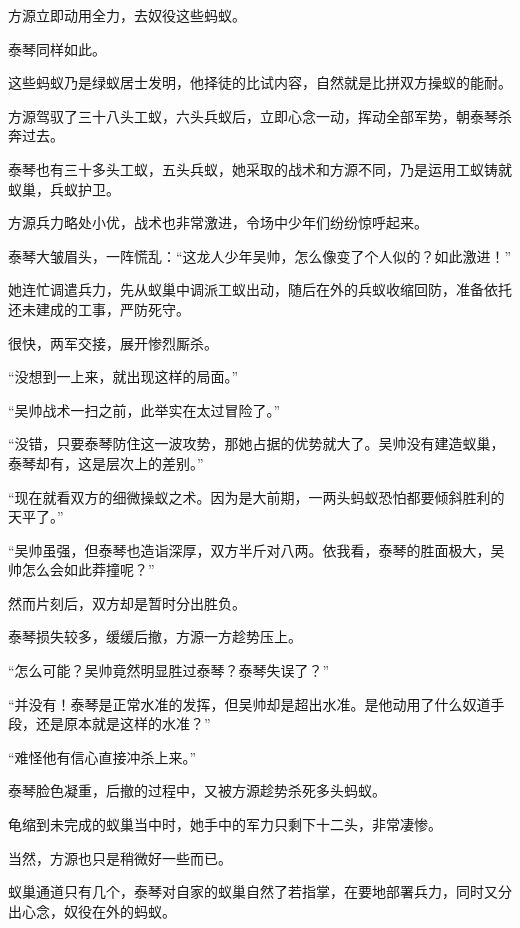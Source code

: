 
\begin{this_body}

方源立即动用全力，去奴役这些蚂蚁。

泰琴同样如此。

这些蚂蚁乃是绿蚁居士发明，他择徒的比试内容，自然就是比拼双方操蚁的能耐。

方源驾驭了三十八头工蚁，六头兵蚁后，立即心念一动，挥动全部军势，朝泰琴杀奔过去。

泰琴也有三十多头工蚁，五头兵蚁，她采取的战术和方源不同，乃是运用工蚁铸就蚁巢，兵蚁护卫。

方源兵力略处小优，战术也非常激进，令场中少年们纷纷惊呼起来。

泰琴大皱眉头，一阵慌乱：“这龙人少年吴帅，怎么像变了个人似的？如此激进！”

她连忙调遣兵力，先从蚁巢中调派工蚁出动，随后在外的兵蚁收缩回防，准备依托还未建成的工事，严防死守。

很快，两军交接，展开惨烈厮杀。

“没想到一上来，就出现这样的局面。”

“吴帅战术一扫之前，此举实在太过冒险了。”

“没错，只要泰琴防住这一波攻势，那她占据的优势就大了。吴帅没有建造蚁巢，泰琴却有，这是层次上的差别。”

“现在就看双方的细微操蚁之术。因为是大前期，一两头蚂蚁恐怕都要倾斜胜利的天平了。”

“吴帅虽强，但泰琴也造诣深厚，双方半斤对八两。依我看，泰琴的胜面极大，吴帅怎么会如此莽撞呢？”

然而片刻后，双方却是暂时分出胜负。

泰琴损失较多，缓缓后撤，方源一方趁势压上。

“怎么可能？吴帅竟然明显胜过泰琴？泰琴失误了？”

“并没有！泰琴是正常水准的发挥，但吴帅却是超出水准。是他动用了什么奴道手段，还是原本就是这样的水准？”

“难怪他有信心直接冲杀上来。”

泰琴脸色凝重，后撤的过程中，又被方源趁势杀死多头蚂蚁。

龟缩到未完成的蚁巢当中时，她手中的军力只剩下十二头，非常凄惨。

当然，方源也只是稍微好一些而已。

蚁巢通道只有几个，泰琴对自家的蚁巢自然了若指掌，在要地部署兵力，同时又分出心念，奴役在外的蚂蚁。


\end{this_body}
